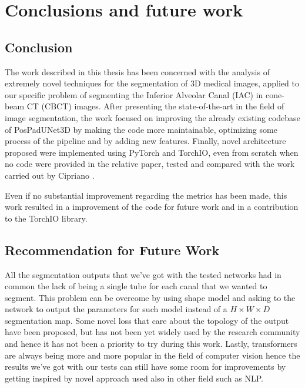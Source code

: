 \chapter{Conclusions and future work}



\section{Conclusion}
\label{sec:conclusion}
The work described in this thesis has been concerned with the analysis of
extremely novel techniques for the segmentation of 3D medical images, applied to
our specific problem of segmenting the Inferior Alveolar Canal (IAC) in
cone-beam CT (CBCT) images.
After presenting the state-of-the-art in the field of image segmentation, the
work focused on improving the already existing codebase of PosPadUNet3D by
making the code more maintainable, optimizing some process of the pipeline and
by adding new features.
Finally, novel architecture proposed were implemented using PyTorch and TorchIO,
even from scratch when no code were provided in the relative paper, tested and
compared with the work carried out by Cipriano \etal.

Even if no substantial improvement regarding the metrics has been made, this
work resulted in a improvement of the code for future work and in a contribution
to the TorchIO library.

\section{Recommendation for Future Work}
All the segmentation outputs that we've got with the tested networks had in
common the lack of being a single tube for each canal that we wanted to segment.
This problem can be overcome by using shape model and asking to the network to
output the parameters for such model instead of a $H \times W \times D$
segmentation map.
Some novel loss that care about the topology of the output have been proposed,
but has not been yet widely used by the research community and hence it has not
been a priority to try during this work.
Lastly, transformers are always being more and more popular in the field of
computer vision hence the results we've got with our tests can still have some
room for improvements by getting inspired by novel approach used also in other
field such as NLP.
